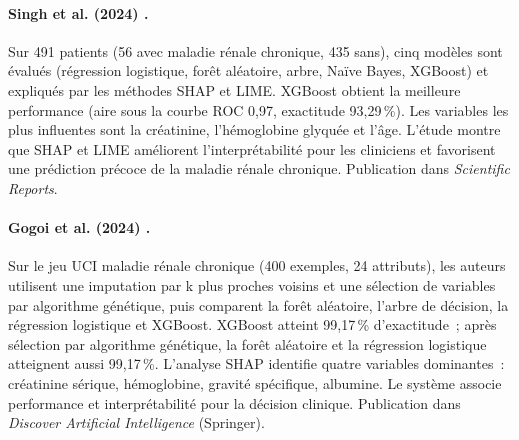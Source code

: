 \paragraph{Singh et al. (2024) \cite{ckd_xai_nature2024}.}
Sur 491 patients (56 avec maladie rénale chronique, 435 sans), cinq modèles sont évalués (régression logistique, forêt aléatoire, arbre, Naïve Bayes, XGBoost) et expliqués par les méthodes SHAP et LIME. XGBoost obtient la meilleure performance (aire sous la courbe ROC 0,97, exactitude 93,29\,\%). Les variables les plus influentes sont la créatinine, l'hémoglobine glyquée et l'âge. L'étude montre que SHAP et LIME améliorent l'interprétabilité pour les cliniciens et favorisent une prédiction précoce de la maladie rénale chronique. Publication dans \emph{Scientific Reports}.

\paragraph{Gogoi et al. (2024) \cite{gogoi2025ckd_shap}.}
Sur le jeu UCI maladie rénale chronique (400 exemples, 24 attributs), les auteurs utilisent une imputation par k plus proches voisins et une sélection de variables par algorithme génétique, puis comparent la forêt aléatoire, l'arbre de décision, la régression logistique et XGBoost. XGBoost atteint 99,17\,\% d'exactitude~; après sélection par algorithme génétique, la forêt aléatoire et la régression logistique atteignent aussi 99,17\,\%. L'analyse SHAP identifie quatre variables dominantes~: créatinine sérique, hémoglobine, gravité spécifique, albumine. Le système associe performance et interprétabilité pour la décision clinique. Publication dans \emph{Discover Artificial Intelligence} (Springer).

